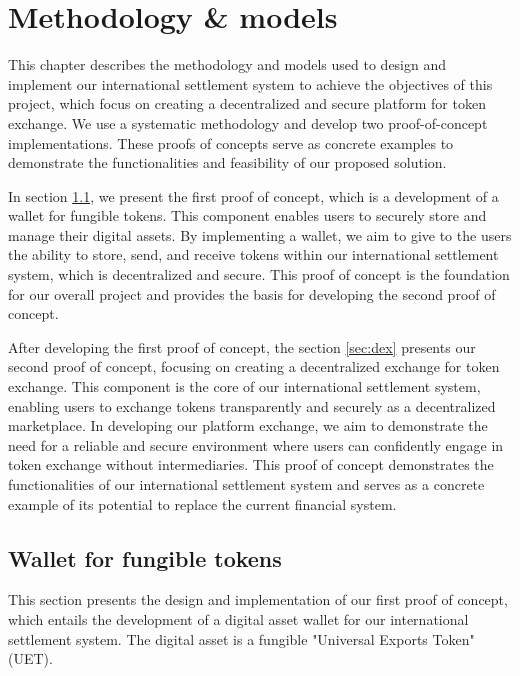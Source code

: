\chapter{Methodology \& models}
\label{ch:methodology}

This chapter describes the methodology and models used to design and implement our international settlement system to achieve
the objectives of this project, which focus on creating a decentralized and secure platform for token exchange. We use a systematic methodology
and develop two proof-of-concept implementations. These proofs of concepts serve as concrete examples to demonstrate the functionalities and
feasibility of our proposed solution.


In section \ref{sec:wallet_fungible_tokens}, we present the first proof of concept, which is a development of a wallet for fungible tokens.
This component enables users to securely store and manage their digital assets. By implementing a wallet, we aim to give
to the users the ability to store, send, and receive tokens within our international settlement system, which is decentralized and secure.
This proof of concept is the foundation for our overall project and provides the basis for developing the second proof of concept.


After developing the first proof of concept, the section \ref{sec:dex} presents our second proof of concept, focusing on creating
a decentralized exchange for token exchange.  This component is the core of our international settlement system, enabling users to
exchange tokens transparently and securely as a decentralized marketplace. In developing our platform exchange, we aim to
demonstrate the need for a reliable and secure environment where users can confidently engage in token exchange without
intermediaries. This proof of concept demonstrates the functionalities of our international settlement system and serves as a concrete example
of its potential to replace the current financial system.


\section{Wallet for fungible tokens}
\label{sec:wallet_fungible_tokens}



This section presents the design and implementation of our first proof of concept, which entails the development of a digital asset wallet
 for our international settlement system. The digital asset is a fungible "Universal Exports Token" (UET).


